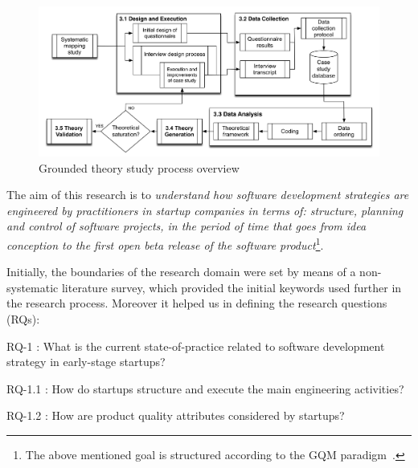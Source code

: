 \documentclass[10pt,journal,letterpaper,compsoc]{IEEEtran}
\begin{document}
\begin{figure}[!t] \centering
\includegraphics[width=5in]{figures/completemethodology2} \caption{Grounded
theory study process overview} \label{fig:gt:completemethodology} \end{figure}

The aim of this research is to \textit{understand how software development
strategies are engineered by practitioners in startup companies in terms of: 
structure, planning and control of software projects, in the period of
time that goes from idea conception to the first open beta release of the
software product}\footnote{The above mentioned goal is structured according to
the GQM paradigm~\cite{Basili1992}.}.

Initially, the boundaries of the research domain were set by means of a
non-systematic literature survey, which provided the initial keywords used  
further in the research process. Moreover it helped us in defining the research
questions (RQs):


\begin{compactitem}

\item RQ-1 : What is the current state-of-practice related to software
development strategy in early-stage startups? 

  \begin{compactitem}
  \item RQ-1.1 : How do startups structure and execute the main engineering
    activities? 
  \item RQ-1.2 : How are product quality attributes considered by
    startups? 
  \end{compactitem}

\end{compactitem}
\end{document}
